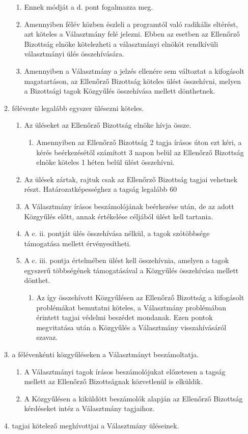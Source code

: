 \documentclass{../styles/rulebook}
\begin{document}
\begin{enumerate}
\begin{enumerate}
\begin{enumerate}
			\item Ennek módját a d. pont fogalmazza meg.
			\item Amennyiben félév közben észleli a programtól való radikális eltérést, azt köteles a Választmány felé jelezni. Ebben az esetben az Ellenőrző Bizottság elnöke kötelezheti a választmányi elnököt rendkívüli választmányi ülés összehívására.
			\item Amennyiben a Választmány a jelzés ellenére sem változtat a kifogásolt magatartáson, az Ellenőrző Bizottság köteles ülést összehívni, melyen a Bizottsági tagok Közgyűlés összehívása mellett dönthetnek.
		\end{enumerate}
		\item félévente legalább egyszer ülésezni köteles.
		\begin{enumerate}
			\item Az üléseket az Ellenőrző Bizottság elnöke hívja össze.
			\begin{enumerate}
				\item Amennyiben az Ellenőrző Bizottság 2 tagja írásos úton ezt kéri, a kérés beérkezésétől számított 3 napon belül az Ellenőrző Bizottság elnöke köteles  1 héten belül ülést összehívni.
			\end{enumerate}
			\item Az ülések zártak, rajtuk csak az Ellenőrző Bizottság tagjai vehetnek részt. Határozatképességhez a tagság legalább 60%
			\item A Választmány írásos beszámolójának beérkezése után, de az adott Közgyűlés előtt, annak értékelése céljából ülést kell tartania.
			\item A c. ii. pontját ülés összehívása nélkül, a tagok szótöbbsége támogatása mellett érvényesítheti.
			\item A c. iii. pontja értelmében ülést kell összehívnia, amelyen a tagok egyszerű többségének támogatásával a Közgyűlés összehívása mellett dönthet.
			\begin{enumerate}
				\item Az így összehívott Közgyűlésen az Ellenőrző Bizottság a kifogásolt problémákat bemutatni köteles, a Választmány problémában érintett tagjai védelmi beszédet mondanak. Ezen pontok megvitatása után a Közgyűlés a Választmány visszahívásáról szavaz.
			\end{enumerate}
		\end{enumerate}
		\item a félévenkénti közgyűléseken a Választmányt beszámoltatja.
		\begin{enumerate}
			\item A Választmányi tagok írásos beszámolójukat előzetesen a tagság mellett az Ellenőrző Bizottságnak közvetlenül is elküldik.
			\item A Közgyűlésen a kiküldött beszámolók alapján az Ellenőrző Bizottság kérdéseket intéz a Választmány tagjaihoz.
		\end{enumerate}
		\item tagjai kötelező meghívottjai a Választmány üléseinek.
	\end{enumerate}
\end{enumerate}
\end{document}
